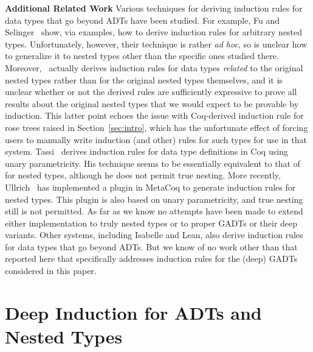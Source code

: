 \documentclass[sigplan,screen]{acmart}
\begin{document}
\vspace*{0.05in}

{\bf Additional Related Work\/} Various techniques for deriving
induction rules for data types that go beyond ADTs have been
studied. For example, Fu and Selinger~\cite{fs18} show, via examples,
how to derive induction rules for arbitrary nested
types. Unfortunately, however, their technique is rather {\em ad hoc},
so is unclear how to generalize it to nested types other than the
specific ones studied there. Moreover,~\cite{fs18} actually derives
induction rules for data types {\em related} to the original nested
types rather than for the original nested types themselves, and it is
unclear whether or not the derived rules are sufficiently expressive
to prove all results about the original nested types that we would
expect to be provable by induction. This latter point echoes the issue
with Coq-derived induction rule for rose trees raised in
Section~\ref{sec:intro}, which has the unfortunate effect of forcing
users to manually write induction (and other) rules for such types for
use in that system. Tassi~\cite{tas19} derives induction rules for
data type definitions in Coq using unary parametricity. His technique
seems to be essentially equivalent to that of~\cite{jp19} for nested
types, although he does not permit true nesting. More recently,
Ullrich~\cite{ull20} has implemented a plugin in MetaCoq to generate
induction rules for nested types. This plugin is also based on unary
parametricity, and true nesting still is not permitted.  As far as we
know no attempts have been made to extend either implementation to
truly nested types or to proper GADTs or their deep variants.  Other
systems, including Isabelle and Lean, also derive induction rules for
data types that go beyond ADTs.  But we know of no work other than
that reported here that specifically addresses induction rules for the
(deep) GADTs considered in this paper.

\section{Deep Induction for ADTs and Nested Types}\label{sec:ADTs-and-nesteds}
\end{document}
